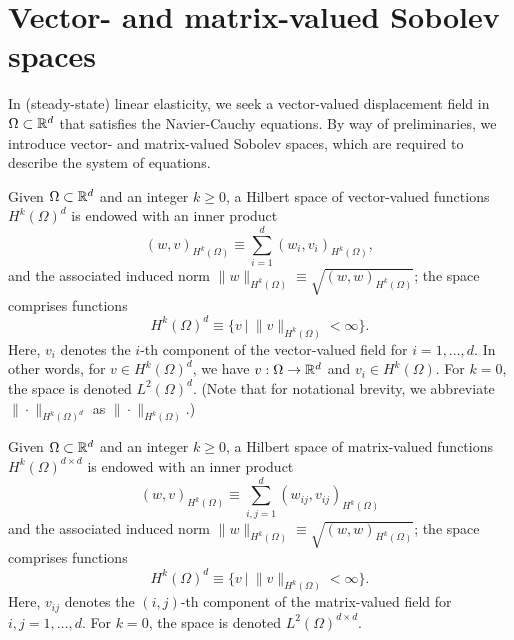 \section{Vector- and matrix-valued Sobolev spaces}
In (steady-state) linear elasticity, we seek a vector-valued displacement field in $\Omega \subset \mathbb{R}^d$ that satisfies the Navier-Cauchy equations. By way of preliminaries, we introduce vector- and matrix-valued Sobolev spaces, which are required to describe the system of equations.
\begin{definition}
  Given $\Omega \subset \mathbb{R}^d$ and an integer $k \geq 0$, a Hilbert space of vector-valued functions $H^k(\Omega)^d$ is endowed with an inner product
  \begin{equation*}
    (w,v)_{H^k(\Omega)} \equiv \sum_{i=1}^d (w_i,v_i)_{H^k(\Omega)},
  \end{equation*}
  and the associated induced norm $\| w \|_{H^k(\Omega)} \equiv \sqrt{(w,w)_{H^k(\Omega)}}$; the space comprises functions
  \begin{equation*}
    H^k(\Omega)^{d} \equiv \{ v \ | \ \| v \|_{H^k(\Omega)} < \infty \}.
  \end{equation*}
  Here, $v_i$ denotes the $i$-th component of the vector-valued field for $i = 1,\dots,d$. In other words, for $v \in H^k(\Omega)^d$, we have $v: \Omega \to \mathbb{R}^d$ and $v_i \in H^k(\Omega)$.  For $k = 0$, the space is denoted $L^2(\Omega)^d$.  (Note that for notational brevity, we abbreviate $\| \cdot \|_{H^k(\Omega)^d}$ as $\| \cdot \|_{H^k(\Omega)}$.)
\end{definition}
\begin{definition}
  Given $\Omega \subset \mathbb{R}^d$ and an integer $k \geq 0$, a Hilbert space of matrix-valued functions $H^k(\Omega)^{d \times d}$ is endowed with an inner product
  \begin{equation*}
    (w,v)_{H^k(\Omega)} \equiv \sum_{i,j=1}^d (w_{ij},v_{ij})_{H^k(\Omega)}
  \end{equation*}
  and the associated induced norm $\| w \|_{H^k(\Omega)} \equiv \sqrt{(w,w)_{H^k(\Omega)}}$; the space comprises functions
  \begin{equation*}
    H^k(\Omega)^d \equiv \{ v \ | \ \| v \|_{H^k(\Omega)} < \infty \}.
  \end{equation*}
  Here, $v_{ij}$ denotes the $(i,j)$-th component of the matrix-valued field for $i,j = 1,\dots,d$. For $k = 0$, the space is denoted $L^2(\Omega)^{d \times d}$.
\end{definition}
